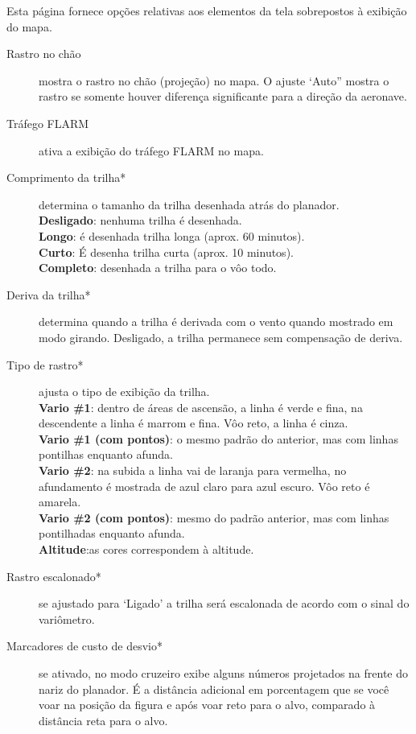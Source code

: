 Esta página fornece opções relativas aos elementos da tela sobrepostos à exibição do mapa.

\begin{description}
\item[Rastro no chão]  mostra o rastro no chão (projeção) no mapa.  O ajuste ‘Auto” mostra o rastro se somente houver diferença significante para a direção da aeronave.
\item[Tráfego FLARM]  \label{conf:flarm-on-map} ativa a exibição do tráfego FLARM no mapa.
\item[Comprimento da trilha*] \label{conf:snailtrail} determina o tamanho da trilha desenhada atrás do planador. \\
  {\bf Desligado}: nenhuma trilha é desenhada. \\
  {\bf Longo}: é desenhada trilha longa (aprox. 60 minutos). \\
  {\bf Curto}: É desenha trilha curta (aprox. 10 minutos). \\
  {\bf Completo}: desenhada a trilha para o vôo todo.
\item[Deriva da trilha*] \label{conf:traildrift} determina quando a trilha é derivada com o vento quando mostrado em modo girando.  Desligado, a trilha permanece sem compensação de deriva.
\item[Tipo de rastro*] \label{conf:snailtype} ajusta o tipo de exibição da trilha. \\
  {\bf Vario \#1}: dentro de áreas de ascensão, a linha é verde e fina, na descendente a linha é marrom e fina.  Vôo reto, a linha é cinza. \\
  {\bf Vario \#1 (com pontos)}: o mesmo padrão do anterior, mas com linhas pontilhas enquanto afunda. \\
  {\bf Vario \#2}: na subida a linha vai de laranja para vermelha, no afundamento é mostrada de azul claro para azul escuro.  Vôo reto é amarela. \\
  {\bf Vario \#2 (com pontos)}: mesmo do padrão anterior, mas com linhas pontilhadas enquanto afunda. \\
  {\bf Altitude}:as cores correspondem à altitude.
\item[Rastro escalonado*] \label{conf:trailscaled} se ajustado para ‘Ligado’ a trilha será escalonada de acordo com o sinal do variômetro.
\item[Marcadores de custo de desvio*]  se ativado, no modo cruzeiro exibe alguns números projetados na frente do nariz do planador.  É a distância adicional em porcentagem que se você voar na posição da figura e após voar reto para o alvo, comparado à distância reta para o alvo.

\end{description}
